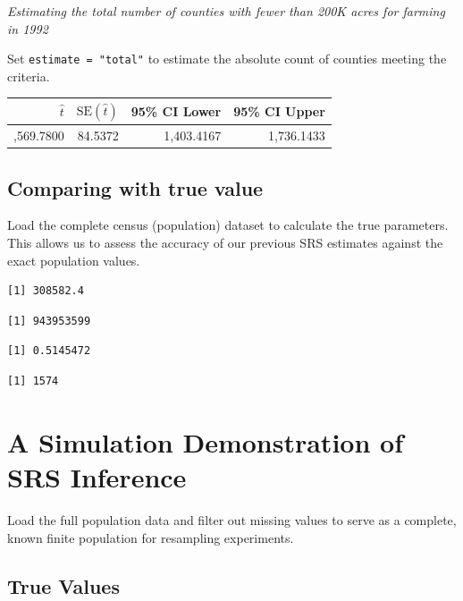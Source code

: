 \documentclass[
  letterpaper,
  DIV=11,
  numbers=noendperiod]{scrreprt}
\renewcommand{\[}{\begin{equation}}
\renewcommand{\]}{\end{equation}}
\begin{document}
\emph{Estimating the total number of counties with fewer than 200K acres
for farming in 1992}

Set \texttt{estimate\ =\ "total"} to estimate the absolute count of
counties meeting the criteria.

\begin{table}
\fontsize{12.0pt}{14.0pt}\selectfont
\begin{tabular*}{0.7\linewidth}{@{\extracolsep{\fill}}rrrr}
\toprule
\(\hat{t}\) & \(\mathrm{SE}(\hat{t})\) & 95\% CI Lower & 95\% CI Upper \\ 
\midrule\addlinespace[2.5pt]
1,569.7800 & 84.5372 & 1,403.4167 & 1,736.1433 \\ 
\bottomrule
\end{tabular*}
\end{table}

\subsection{Comparing with true value}\label{comparing-with-true-value}

Load the complete census (population) dataset to calculate the true
parameters. This allows us to assess the accuracy of our previous SRS
estimates against the exact population values.

\begin{verbatim}
[1] 308582.4
\end{verbatim}

\begin{verbatim}
[1] 943953599
\end{verbatim}

\begin{verbatim}
[1] 0.5145472
\end{verbatim}

\begin{verbatim}
[1] 1574
\end{verbatim}

\section{A Simulation Demonstration of SRS
Inference}\label{a-simulation-demonstration-of-srs-inference}

Load the full population data and filter out missing values to serve as
a complete, known finite population for resampling experiments.

\subsection{True Values}\label{true-values}
\end{document}
